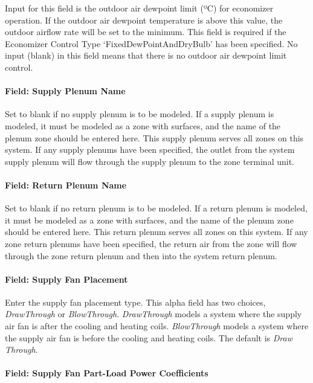 Input for this field is the outdoor air dewpoint limit (ºC) for economizer operation. If the outdoor air dewpoint temperature is above this value, the outdoor airflow rate will be set to the minimum. This field is required if the Economizer Control Type `FixedDewPointAndDryBulb' has been specified. No input (blank) in this field means that there is no outdoor air dewpoint limit control.

\paragraph{Field: Supply Plenum Name}\label{field-supply-plenum-name-8}

Set to blank if no supply plenum is to be modeled. If a supply plenum is modeled, it must be modeled as a zone with surfaces, and the name of the plenum zone should be entered here. This supply plenum serves all zones on this system. If any supply plenums have been specified, the outlet from the system supply plenum will flow through the supply plenum to the zone terminal unit.

\paragraph{Field: Return Plenum Name}\label{field-return-plenum-name-9}

Set to blank if no return plenum is to be modeled. If a return plenum is modeled, it must be modeled as a zone with surfaces, and the name of the plenum zone should be entered here. This return plenum serves all zones on this system. If any zone return plenums have been specified, the return air from the zone will flow through the zone return plenum and then into the system return plenum.

\paragraph{Field: Supply Fan Placement}\label{field-supply-fan-placement-7}

Enter the supply fan placement type. This alpha field has two choices, \emph{DrawThrough} or \emph{BlowThrough}. \emph{DrawThrough} models a system where the supply air fan is after the cooling and heating coils. \emph{BlowThrough} models a system where the supply air fan is before the cooling and heating coils. The default is \emph{Draw Through}.

\paragraph{Field: Supply Fan Part-Load Power Coefficients}\label{field-supply-fan-part-load-power-coefficients}

